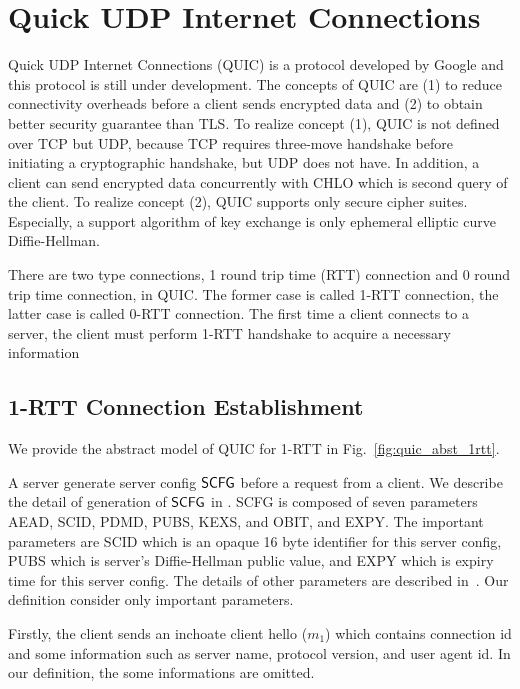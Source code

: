 \section{Quick UDP Internet Connections} \label{sec:quic}

Quick UDP Internet Connections (QUIC) is a protocol
developed by Google and this protocol is still under
development.
The concepts of QUIC are (1) to reduce connectivity
overheads before a client sends encrypted data and
(2) to obtain better security guarantee than TLS.
To realize concept (1), QUIC is not defined over
TCP but UDP, because TCP requires three-move handshake
before initiating a cryptographic handshake, but UDP
does not have. In addition, a client can send encrypted
data concurrently with CHLO which is second query of the
client.
To realize concept (2), QUIC supports only secure cipher
suites. Especially, a support algorithm of key exchange
is only ephemeral elliptic curve Diffie-Hellman.

There are two type connections, 1 round trip time (RTT)
connection and 0 round trip time connection, in QUIC.
The former case is called 1-RTT connection, the latter
case is called 0-RTT connection.
The first time a client connects to a server, the client
must perform 1-RTT handshake to acquire a necessary
information

\subsection{1-RTT Connection Establishment} \label{sec:quic_1rtt}

We provide the abstract model of QUIC for 1-RTT in
Fig.~\ref{fig:quic_abst_1rtt}.
%

%
A server generate server config $\mathsf{SCFG}$ before a request from a client.
We describe the detail of generation of $\mathsf{SCFG}$ in \label{sec:proposed_scheme}.
SCFG is composed of seven parameters AEAD, SCID, PDMD,
PUBS, KEXS, and OBIT, and EXPY. The important parameters
are SCID which is an opaque 16 byte identifier for
this server config, PUBS which is server's
Diffie-Hellman public value, and EXPY which is expiry time
for this server config. The details of other parameters
are described in~\cite{QUIC:Crypto}.
Our definition consider only important parameters.

Firstly, the client sends an inchoate client
hello ($m_1$) which contains connection id
and some information such as server name, protocol
version, and user agent id. In our definition,
the some informations are omitted.

